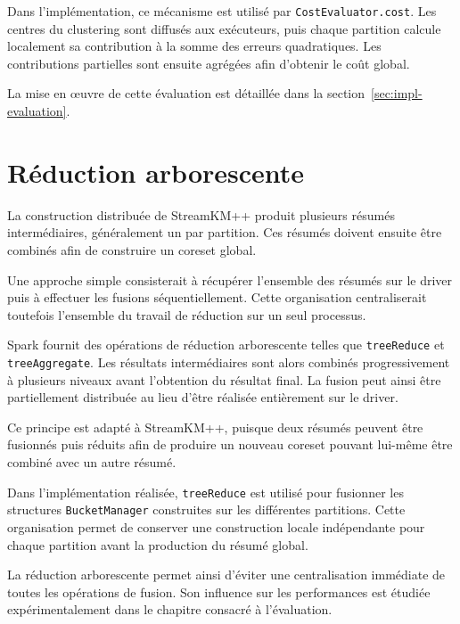 Dans l'implémentation, ce mécanisme est utilisé par \texttt{CostEvaluator.cost}. Les centres du clustering sont diffusés aux exécuteurs, puis chaque partition calcule localement sa contribution à la somme des erreurs quadratiques. Les contributions partielles sont ensuite agrégées afin d'obtenir le coût global.

La mise en œuvre de cette évaluation est détaillée dans la section~\ref{sec:impl-evaluation}.

\section{Réduction arborescente}
\label{sec:spark-treereduce}

La construction distribuée de StreamKM++ produit plusieurs résumés intermédiaires, généralement un par partition. Ces résumés doivent ensuite être combinés afin de construire un coreset global.

Une approche simple consisterait à récupérer l'ensemble des résumés sur le driver puis à effectuer les fusions séquentiellement. Cette organisation centraliserait toutefois l'ensemble du travail de réduction sur un seul processus.

Spark fournit des opérations de réduction arborescente telles que \texttt{treeReduce} et \texttt{treeAggregate}. Les résultats intermédiaires sont alors combinés progressivement à plusieurs niveaux avant l'obtention du résultat final. La fusion peut ainsi être partiellement distribuée au lieu d'être réalisée entièrement sur le driver.

Ce principe est adapté à StreamKM++, puisque deux résumés peuvent être fusionnés puis réduits afin de produire un nouveau coreset pouvant lui-même être combiné avec un autre résumé.

Dans l'implémentation réalisée, \texttt{treeReduce} est utilisé pour fusionner les structures \texttt{BucketManager} construites sur les différentes partitions. Cette organisation permet de conserver une construction locale indépendante pour chaque partition avant la production du résumé global.

La réduction arborescente permet ainsi d'éviter une centralisation immédiate de toutes les opérations de fusion. Son influence sur les performances est étudiée expérimentalement dans le chapitre consacré à l'évaluation.


